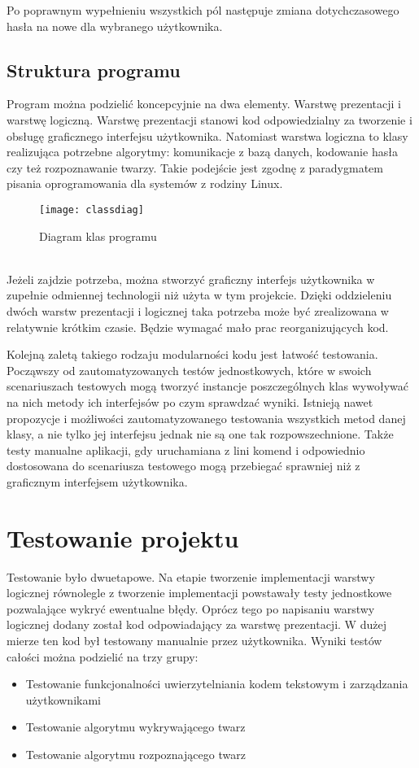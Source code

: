 \documentclass[eng,printmode]{mgr}
\begin{document}
Po poprawnym wypełnieniu wszystkich pól następuje zmiana dotychczasowego hasła na nowe dla wybranego użytkownika.
\section{Struktura programu}
Program można podzielić koncepcyjnie na dwa elementy. Warstwę prezentacji i warstwę logiczną. Warstwę prezentacji stanowi kod odpowiedzialny za tworzenie i obsługę graficznego interfejsu użytkownika. Natomiast warstwa logiczna to klasy realizująca potrzebne algorytmy: komunikacje z bazą danych, kodowanie hasła czy też rozpoznawanie twarzy. Takie podejście jest zgodnę z paradygmatem pisania oprogramowania dla systemów z rodziny Linux.\\
\begin{figure}[placement h]
\texttt{[image: classdiag]}
\caption{Diagram klas programu}
\end{figure}\\
Jeżeli zajdzie potrzeba, można stworzyć graficzny interfejs użytkownika w zupełnie odmiennej technologii niż użyta w tym projekcie. Dzięki oddzieleniu dwóch warstw prezentacji i logicznej taka potrzeba może być zrealizowana w relatywnie krótkim czasie. Będzie wymagać mało prac reorganizujących kod.

Kolejną zaletą takiego rodzaju modularności kodu jest łatwość testowania. Począwszy od zautomatyzowanych testów jednostkowych, które w swoich scenariuszach testowych mogą tworzyć instancje poszczególnych klas wywoływać na nich metody ich interfejsów po czym sprawdzać wyniki. Istnieją nawet propozycje i możliwości zautomatyzowanego testowania wszystkich metod danej klasy, a nie tylko jej interfejsu jednak nie są one tak rozpowszechnione. Także testy manualne aplikacji, gdy uruchamiana z lini komend i odpowiednio dostosowana do scenariusza testowego mogą przebiegać sprawniej niż z graficznym interfejsem użytkownika.

\chapter{Testowanie projektu}

Testowanie było dwuetapowe. Na etapie tworzenie implementacji warstwy logicznej równolegle z tworzenie implementacji powstawały testy jednostkowe pozwalające wykryć ewentualne błędy. Oprócz tego po napisaniu warstwy logicznej dodany został kod odpowiadający za warstwę prezentacji. W dużej mierze ten kod był testowany manualnie przez użytkownika. Wyniki testów całości można podzielić na trzy grupy:
\begin{itemize}
\item{Testowanie funkcjonalności uwierzytelniania kodem tekstowym i zarządzania użytkownikami}
\item{Testowanie algorytmu wykrywającego twarz}
\item{Testowanie algorytmu rozpoznającego twarz}
\end{itemize}
\end{document}
